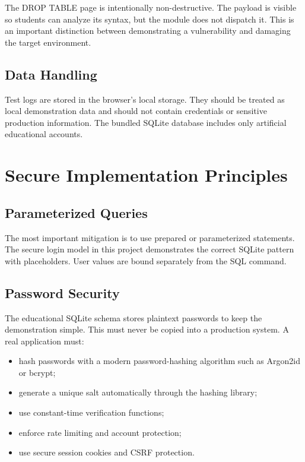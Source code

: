 \documentclass[12pt,a4paper]{article}
\newcommand{\code}[1]{\texttt{\detokenize{#1}}}
\begin{document}
The DROP TABLE page is intentionally non-destructive. The payload is visible so students can analyze its syntax, but the module does not dispatch it. This is an important distinction between demonstrating a vulnerability and damaging the target environment.

\subsection{Data Handling}

Test logs are stored in the browser's local storage. They should be treated as local demonstration data and should not contain credentials or sensitive production information. The bundled SQLite database includes only artificial educational accounts.

\section{Secure Implementation Principles}

\subsection{Parameterized Queries}

The most important mitigation is to use prepared or parameterized statements. The secure login model in this project demonstrates the correct SQLite pattern with \code{?} placeholders. User values are bound separately from the SQL command.

\subsection{Password Security}

The educational SQLite schema stores plaintext passwords to keep the demonstration simple. This must never be copied into a production system. A real application must:

\begin{itemize}[leftmargin=1.4cm]
    \item hash passwords with a modern password-hashing algorithm such as Argon2id or bcrypt;
    \item generate a unique salt automatically through the hashing library;
    \item use constant-time verification functions;
    \item enforce rate limiting and account protection;
    \item use secure session cookies and CSRF protection.
\end{itemize}
\end{document}
